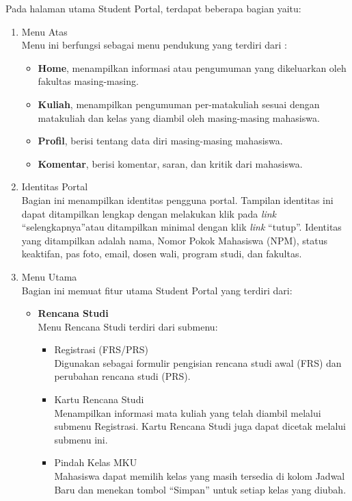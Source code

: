 Pada halaman utama Student Portal, terdapat beberapa bagian yaitu:
\begin{enumerate}
	\item Menu Atas\\
	Menu ini berfungsi sebagai menu pendukung yang terdiri dari : 
	\begin{itemize}
		\item \textbf{Home}, menampilkan informasi atau pengumuman yang dikeluarkan oleh fakultas masing-masing. 
		\item \textbf{Kuliah}, menampilkan pengumuman per-matakuliah sesuai dengan matakuliah dan kelas yang diambil oleh masing-masing mahasiswa.  
		\item \textbf{Profil}, berisi tentang data diri masing-masing mahasiswa. 
		\item \textbf{Komentar}, berisi komentar, saran, dan kritik dari mahasiswa.
	\end{itemize}
	
	\item Identitas Portal \\
	Bagian ini menampilkan identitas pengguna portal. Tampilan identitas ini dapat ditampilkan lengkap dengan melakukan klik pada \textit{link} "`selengkapnya"'atau ditampilkan minimal dengan klik \textit{link} "`tutup"'. Identitas yang ditampilkan adalah nama, Nomor Pokok Mahasiswa (NPM), status keaktifan, pas foto, email, dosen wali, program studi, dan fakultas.   
	
	\item Menu Utama\\
	Bagian ini memuat fitur utama Student Portal yang terdiri dari:
	\begin{itemize}
	
		\item \textbf{Rencana Studi}\\
		Menu Rencana Studi terdiri dari submenu: 
		\begin{itemize}
			\item Registrasi (FRS/PRS)\\
			Digunakan sebagai formulir pengisian rencana studi awal (FRS) dan perubahan rencana studi (PRS). 
			\item Kartu Rencana Studi \\
			Menampilkan informasi mata kuliah yang telah diambil melalui submenu Registrasi. Kartu Rencana Studi juga dapat dicetak melalui submenu ini. 
			\item Pindah Kelas MKU \\
			Mahasiswa dapat memilih kelas yang masih tersedia di kolom Jadwal Baru dan menekan tombol "`Simpan"' untuk setiap kelas yang diubah. 
		\end{itemize}
		

\end{itemize}
\end{enumerate}
